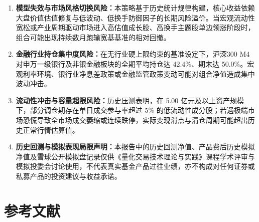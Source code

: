 \documentclass[12pt,a4paper]{article}
\let\origsection\section
\renewcommand{\section}[1]{\needspace{6.5\baselineskip}\origsection{#1}}
\begin{document}
\begin{enumerate}[leftmargin=2.2em, itemsep=2pt, topsep=3pt]
  \item \textbf{模型失效与市场风格切换风险：}本策略基于历史统计规律构建，核心收益依赖大盘价值估值修复与低波动、低换手防御因子的长期风险溢价。当宏观流动性宽松或产业周期驱动市场进入高估值成长股、高换手主题股单边领涨阶段时，组合可能出现持续数月跑输宽基基准的相对回撤。
  \item \textbf{金融行业持仓集中度风险：}在无行业硬上限约束的基准设定下，沪深300 M4 对申万一级银行及非银金融板块的全期平均持仓达 42.4\%、期末达 50.0\%。宏观利率环境、银行业净息差政策或金融监管政策变动可能对组合净值造成集中波动冲击。
  \item \textbf{流动性冲击与容量超限风险：}历史压测表明，在 5.00 亿元及以上资产规模下，部分调仓期存在单日成交参与率超过 5\% 的低流动性成分股；若遇极端市场恐慌导致全市场成交萎缩或连续跌停，实际变现滑点与清仓周期可能超出历史正常行情估算值。
  \item \textbf{历史回测与模拟表现局限声明：}本报告中的历史回测净值、产品费后历史模拟净值及雪球公开模拟盘记录仅供《量化交易技术理论与实践》课程学术评审与模拟投委会讨论使用，不代表真实基金产品过往业绩，亦不构成对任何证券或私募产品的投资建议与收益承诺。
\end{enumerate}

\newpage

\section{参考文献}
\end{document}
